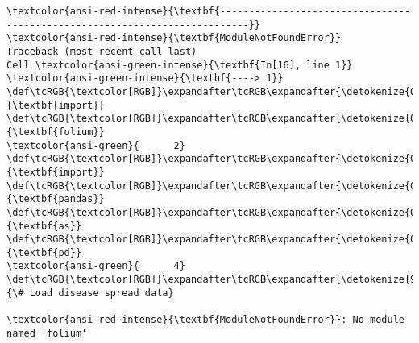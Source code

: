 \documentclass[11pt]{article}
\begin{document}
    \begin{Verbatim}[commandchars=\\\{\}, frame=single, framerule=2mm, rulecolor=\color{outerrorbackground}]
\textcolor{ansi-red-intense}{\textbf{---------------------------------------------------------------------------}}
\textcolor{ansi-red-intense}{\textbf{ModuleNotFoundError}}                       Traceback (most recent call last)
Cell \textcolor{ansi-green-intense}{\textbf{In[16], line 1}}
\textcolor{ansi-green-intense}{\textbf{----> 1}} \def\tcRGB{\textcolor[RGB]}\expandafter\tcRGB\expandafter{\detokenize{0,135,0}}{\textbf{import}} \def\tcRGB{\textcolor[RGB]}\expandafter\tcRGB\expandafter{\detokenize{0,0,255}}{\textbf{folium}}
\textcolor{ansi-green}{      2} \def\tcRGB{\textcolor[RGB]}\expandafter\tcRGB\expandafter{\detokenize{0,135,0}}{\textbf{import}} \def\tcRGB{\textcolor[RGB]}\expandafter\tcRGB\expandafter{\detokenize{0,0,255}}{\textbf{pandas}} \def\tcRGB{\textcolor[RGB]}\expandafter\tcRGB\expandafter{\detokenize{0,135,0}}{\textbf{as}} \def\tcRGB{\textcolor[RGB]}\expandafter\tcRGB\expandafter{\detokenize{0,0,255}}{\textbf{pd}}
\textcolor{ansi-green}{      4} \def\tcRGB{\textcolor[RGB]}\expandafter\tcRGB\expandafter{\detokenize{95,135,135}}{\# Load disease spread data}

\textcolor{ansi-red-intense}{\textbf{ModuleNotFoundError}}: No module named 'folium'
    \end{Verbatim}
\end{document}
